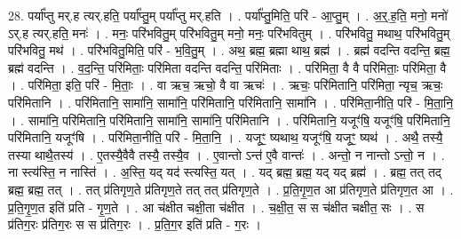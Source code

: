 \documentclass[17pt]{extarticle}
\begin{document}
28. पर्या᳚प्तु मर्.ह त्यर्.हति॒ पर्या᳚प्तु॒म् पर्या᳚प्तु मर्.हति । . पर्या᳚प्तु॒मिति॒ परि॑ - आ॒प्तु॒म् । . अ॒र्॒.ह॒ति॒ मनो॒ मनो॑ ऽर्.ह त्यर्.हति॒ मनः॑ । . मनः॒ परि॑भवितु॒म् परि॑भवितु॒म् मनो॒ मनः॒ परि॑भवितुम् । . परि॑भवितु॒ मथाथ॒ परि॑भवितु॒म् परि॑भवितु॒ मथ॑ । . परि॑भवितु॒मिति॒ परि॑ - भ॒वि॒तु॒म् । . अथ॒ ब्रह्म॒ ब्रह्मा थाथ॒ ब्रह्म॑ । . ब्रह्म॑ वदन्ति वदन्ति॒ ब्रह्म॒ ब्रह्म॑ वदन्ति । . व॒द॒न्ति॒ परि॑मिताः॒ परि॑मिता वदन्ति वदन्ति॒ परि॑मिताः । . परि॑मिता॒ वै वै परि॑मिताः॒ परि॑मिता॒ वै । . परि॑मिता॒ इति॒ परि॑ - मि॒ताः॒ । . वा ऋच॒ ऋचो॒ वै वा ऋचः॑ । . ऋचः॒ परि॑मितानि॒ परि॑मिता॒ न्यृच॒ ऋचः॒ परि॑मितानि । . परि॑मितानि॒ सामा॑नि॒ सामा॑नि॒ परि॑मितानि॒ परि॑मितानि॒ सामा॑नि । . परि॑मिता॒नीति॒ परि॑ - मि॒ता॒नि॒ । . सामा॑नि॒ परि॑मितानि॒ परि॑मितानि॒ सामा॑नि॒ सामा॑नि॒ परि॑मितानि । . परि॑मितानि॒ यजूꣳ॑षि॒ यजूꣳ॑षि॒ परि॑मितानि॒ परि॑मितानि॒ यजूꣳ॑षि । . परि॑मिता॒नीति॒ परि॑ - मि॒ता॒नि॒ । . यजूꣳ॒॒ ष्यथाथ॒ यजूꣳ॑षि॒ यजूꣳ॒॒ ष्यथ॑ । . अथै॒ तस्यै॒ तस्या थाथै॒तस्य॑ । . ए॒तस्यै॒वैवै तस्यै॒ तस्यै॒व । . ए॒वान्तो ऽन्त॑ ए॒वै वान्तः॑ । . अन्तो॒ न नान्तो ऽन्तो॒ न । . ना स्त्य॑स्ति॒ न नास्ति॑ । . अ॒स्ति॒ यद् यद॑ स्त्यस्ति॒ यत् । . यद् ब्रह्म॒ ब्रह्म॒ यद् यद् ब्रह्म॑ । . ब्रह्म॒ तत् तद् ब्रह्म॒ ब्रह्म॒ तत् । . तत् प्र॑तिगृण॒ते प्र॑तिगृण॒ते तत् तत् प्र॑तिगृण॒ते । . प्र॒ति॒गृ॒ण॒त आ प्र॑तिगृण॒ते प्र॑तिगृण॒त आ । . प्र॒ति॒गृ॒ण॒त इति॑ प्रति - गृ॒ण॒ते । . आ च॑क्षीत चक्षी॒ता च॑क्षीत । . च॒क्षी॒त॒ स स च॑क्षीत चक्षीत॒ सः । . स प्र॑तिग॒रः प्र॑तिग॒रः स स प्र॑तिग॒रः । . प्र॒ति॒ग॒र इति॑ प्रति - ग॒रः । \newline
\end{document}
